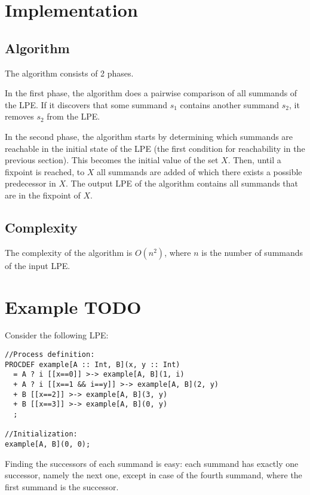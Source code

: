 \section{Implementation}

\subsection{Algorithm}

The algorithm consists of 2 phases.

In the first phase, the algorithm does a pairwise comparison of all summands of the LPE.
If it discovers that some summand $s_1$ contains another summand $s_2$, it removes $s_2$ from the LPE.

In the second phase, the algorithm starts by determining which summands are reachable in the initial state of the LPE (the first condition for reachability in the previous section).
This becomes the initial value of the set $X$.
Then, until a fixpoint is reached, to $X$ all summands are added of which there exists a possible predecessor in $X$.
The output LPE of the algorithm contains all summands that are in the fixpoint of $X$.

\subsection{Complexity}

The complexity of the algorithm is $O(n^2)$, where $n$ is the number of summands of the input LPE.

\section{Example TODO}

Consider the following LPE:

\begin{lstlisting}
//Process definition:
PROCDEF example[A :: Int, B](x, y :: Int)
  = A ? i [[x==0]] >-> example[A, B](1, i)
  + A ? i [[x==1 && i==y]] >-> example[A, B](2, y)
  + B [[x==2]] >-> example[A, B](3, y)
  + B [[x==3]] >-> example[A, B](0, y)
  ;

//Initialization:
example[A, B](0, 0);
\end{lstlisting}

Finding the successors of each summand is easy: each summand has exactly one successor, namely the next one, except in case of the fourth summand, where the first summand is the successor.

